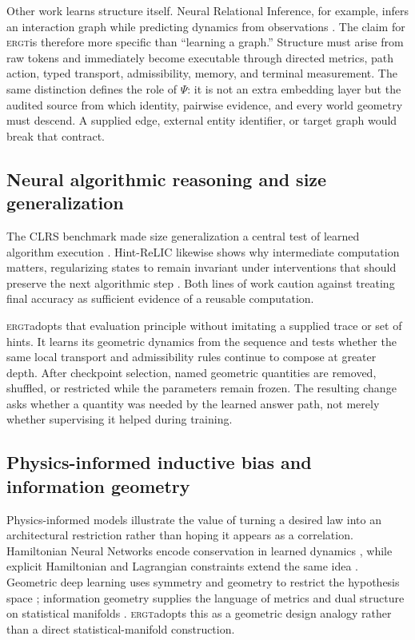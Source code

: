 \documentclass[11pt]{article}
\newcommand{\ERGT}{\textsc{ergt}}
\begin{document}
Other work learns structure itself. Neural Relational Inference, for example,
infers an interaction graph while predicting dynamics from observations
\cite{kipf2018nri}. The claim for \ERGT is therefore more specific than
``learning a graph.'' Structure must arise from raw tokens and immediately
become executable through directed metrics, path action, typed transport,
admissibility, memory, and terminal measurement. The same distinction defines
the role of $\Psi$: it is not an extra embedding layer but the audited source
from which identity, pairwise evidence, and every world geometry must descend.
A supplied edge, external entity identifier, or target graph would break that
contract.

\subsection{Neural algorithmic reasoning and size generalization}

The CLRS benchmark made size generalization a central test of learned algorithm
execution \cite{velickovic2022clrs}. Hint-ReLIC likewise shows why intermediate
computation matters, regularizing states to remain invariant under
interventions that should preserve the next algorithmic step
\cite{bevilacqua2023causal}. Both lines of work caution against treating final
accuracy as sufficient evidence of a reusable computation.

\ERGT adopts that evaluation principle without imitating a supplied trace or
set of hints. It learns its geometric dynamics from the sequence and tests
whether the same local transport and admissibility rules continue to compose at
greater depth. After checkpoint selection, named geometric quantities are
removed, shuffled, or restricted while the parameters remain frozen. The
resulting change asks whether a quantity was needed by the learned answer path,
not merely whether supervising it helped during training.

\subsection{Physics-informed inductive bias and information geometry}

Physics-informed models illustrate the value of turning a desired law into an
architectural restriction rather than hoping it appears as a correlation.
Hamiltonian Neural Networks encode conservation in learned dynamics
\cite{greydanus2019hamiltonian}, while explicit Hamiltonian and Lagrangian
constraints extend the same idea \cite{finzi2020constraints}. Geometric deep
learning uses symmetry and geometry to restrict the hypothesis space
\cite{bronstein2021geometric}; information geometry supplies the language of
metrics and dual structure on statistical manifolds \cite{amari2016information}.
\ERGT adopts this as a geometric design analogy rather than a direct
statistical-manifold construction.
\end{document}
